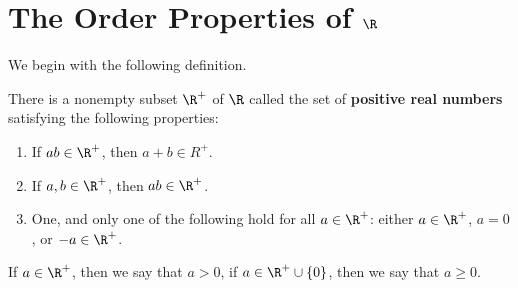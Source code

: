
\section{The Order Properties of $\R$}

We begin with the following definition.

\begin{definition}
    There is a nonempty subset  $\R^+$ of  $\R$ called the set of \textbf{positive real numbers} satisfying the following 
    properties:
    \begin{enumerate}[label=(\arabic*)]
        \item If $ab \in \R^+$, then $a+b \in R^+$.

        \item If $a,b \in \R^+$, then  $ab \in \R^+$.

        \item One, and only one of the following hold for all $a \in \R^+$: either $a \in \R^+$,  $a=0$, or  $-a \in \R^+$.
    \end{enumerate}
\end{definition}

If $a \in \R^+$, then we say that  $a>0$, if  $a \in \R^+ \cup \{0\}$, then we say that $a \geq 0$.

